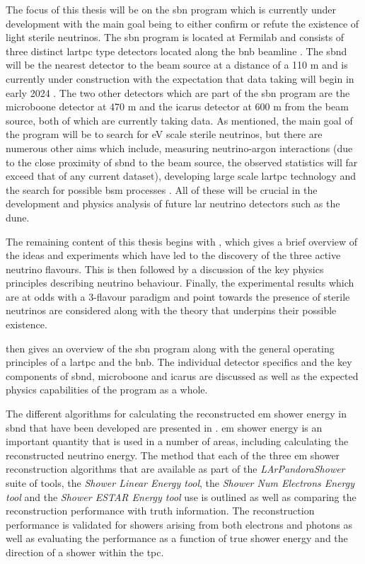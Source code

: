 The focus of this thesis will be on the \gls{sbn} program which is currently under development with the main goal being to either confirm or refute the existence of light sterile neutrinos. The \gls{sbn} program is located at Fermilab and consists of three distinct \gls{lartpc} type detectors located along the \gls{bnb} beamline \cite{SBN_Proposal}. The \gls{sbnd} will be the nearest detector to the beam source at a distance of a 110 m and is currently under construction with the expectation that data taking will begin in early 2024 \cite{sbnd_timeline}. The two other detectors which are part of the \gls{sbn} program are the \gls{microboone} detector at 470 m and the \gls{icarus} detector at 600 m from the beam source, both of which are currently taking data. As mentioned, the main goal of the program will be to search for eV scale sterile neutrinos, but there are numerous other aims which include, measuring neutrino-argon interactions (due to the close proximity of \gls{sbnd} to the beam source, the observed statistics will far exceed that of any current dataset), developing large scale \gls{lartpc} technology and the search for possible \gls{bsm} processes \cite{SBN_paper}. All of these will be crucial in the development and physics analysis of future \gls{lar} neutrino detectors such as the \gls{dune}. 

The remaining content of this thesis begins with , which gives a brief overview of the ideas and experiments which have led to the discovery of the three active neutrino flavours. This is then followed by a discussion of the key physics principles describing neutrino behaviour. Finally, the experimental results which are at odds with a 3-flavour paradigm and point towards the presence of sterile neutrinos are considered along with the theory that underpins their possible existence. 

 then gives an overview of the \gls{sbn} program along with the general operating principles of a \gls{lartpc} and the \gls{bnb}. The individual detector specifics and the key components of \gls{sbnd}, \gls{microboone} and \gls{icarus} are discussed as well as the expected physics capabilities of the program as a whole. 

The different algorithms for calculating the reconstructed \gls{em} shower energy in \gls{sbnd} that have been developed are presented in . \gls{em} shower energy is an important quantity that is used in a number of areas, including calculating the reconstructed neutrino energy. The method that each of the three \gls{em} shower reconstruction algorithms that are available as part of the \textit{LArPandoraShower} suite of tools, the \textit{Shower Linear Energy tool}, the \textit{Shower Num Electrons Energy tool} and the \textit{Shower ESTAR Energy tool} use is outlined as well as comparing the reconstruction performance with truth information. The reconstruction performance is validated for showers arising from both electrons and photons as well as evaluating the performance as a function of true shower energy and the direction of a shower within the \gls{tpc}. 

